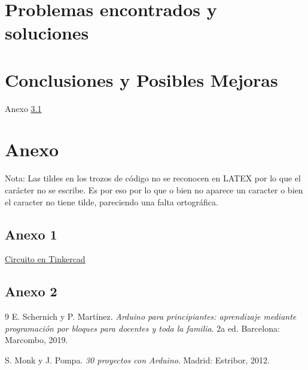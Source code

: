 \documentclass[a4paper]{article}
\begin{document}
\section{Problemas encontrados y soluciones}
\section{Conclusiones y Posibles Mejoras}


Anexo \ref{anexo:an1}



\section{Anexo}

Nota: Las tildes en los trozos de código no se reconocen en LATEX por lo que el carácter no se escribe. Es por eso por lo que o bien no aparece un caracter o bien el caracter no tiene tilde, pareciendo una falta ortográfica.\\
\subsection{Anexo 1} \label{anexo:an1} 
%
\href{https://www.tinkercad.com/things/cJ7XJBloj7o/editel?returnTo=%2Fdashboard%2Fcollections%2F45N1xWNxGAp%2Fall&sharecode=4sl_ZT-0OL1J4BYZHna3SUFVUEHoGAx84j9y6vthwKQ}{Circuito en Tinkercad}

\subsection{Anexo 2} \label{anexo:an2} 
%

\newpage
\begin{thebibliography}{9}
    E. Schernich y P. Martínez. 
    \textit{Arduino para principiantes: aprendizaje mediante programación por bloques para docentes y toda la familia}. 
    2a ed. Barcelona: Marcombo, 2019.
    
    S. Monk y J. Pompa. 
    \textit{30 proyectos con Arduino}. 
    Madrid: Estribor, 2012.
\end{thebibliography}
\end{document}
